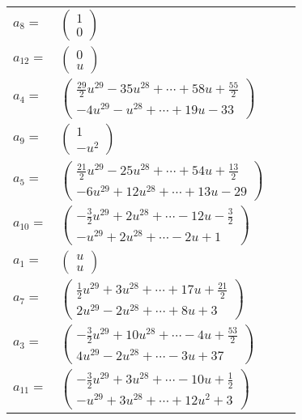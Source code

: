 \documentclass[1p]{elsarticle_modified}
\theoremstyle{definition}
\begin{document}
\begin{tabular}{m{7pt} m{180pt} m{7pt} m{180pt} }
\flushright $a_{8}=$&$\begin{pmatrix}1\\0\end{pmatrix}$ \\
\flushright $a_{12}=$&$\begin{pmatrix}0\\u\end{pmatrix}$ \\
\flushright $a_{4}=$&$\begin{pmatrix}\frac{29}{2} u^{29}-35 u^{28}+\cdots+58 u+\frac{55}{2}\\-4 u^{29}- u^{28}+\cdots+19 u-33\end{pmatrix}$ \\
\flushright $a_{9}=$&$\begin{pmatrix}1\\- u^2\end{pmatrix}$ \\
\flushright $a_{5}=$&$\begin{pmatrix}\frac{21}{2} u^{29}-25 u^{28}+\cdots+54 u+\frac{13}{2}\\-6 u^{29}+12 u^{28}+\cdots+13 u-29\end{pmatrix}$ \\
\flushright $a_{10}=$&$\begin{pmatrix}-\frac{3}{2} u^{29}+2 u^{28}+\cdots-12 u-\frac{3}{2}\\- u^{29}+2 u^{28}+\cdots-2 u+1\end{pmatrix}$ \\
\flushright $a_{1}=$&$\begin{pmatrix}u\\u\end{pmatrix}$ \\
\flushright $a_{7}=$&$\begin{pmatrix}\frac{1}{2} u^{29}+3 u^{28}+\cdots+17 u+\frac{21}{2}\\2 u^{29}-2 u^{28}+\cdots+8 u+3\end{pmatrix}$ \\
\flushright $a_{3}=$&$\begin{pmatrix}-\frac{3}{2} u^{29}+10 u^{28}+\cdots-4 u+\frac{53}{2}\\4 u^{29}-2 u^{28}+\cdots-3 u+37\end{pmatrix}$ \\
\flushright $a_{11}=$&$\begin{pmatrix}-\frac{3}{2} u^{29}+3 u^{28}+\cdots-10 u+\frac{1}{2}\\- u^{29}+3 u^{28}+\cdots+12 u^2+3\end{pmatrix}$ \\

\end{tabular}
\end{document}
